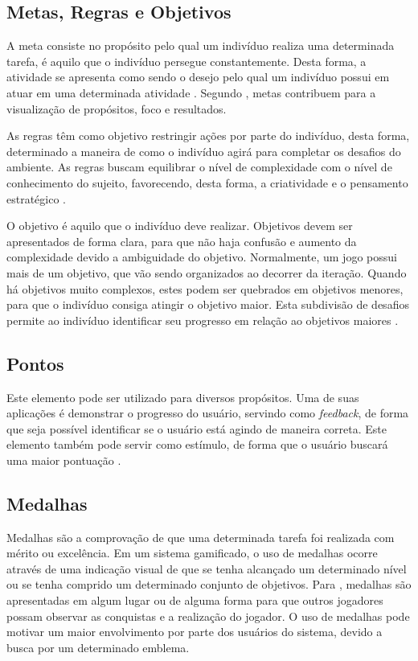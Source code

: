 \documentclass[
	12pt,				%
	oneside,			%
	a4paper,			%
	english,			%
	french,				%
	spanish,			%
	brazil,				%
	]{abntex2}
\begin{document}
\subsection{Metas, Regras e Objetivos}

A meta consiste no propósito pelo qual um indivíduo realiza uma determinada tarefa, é aquilo que o indivíduo persegue constantemente. Desta forma, a atividade se apresenta como sendo o desejo pelo qual um indivíduo possui em atuar em uma determinada atividade \cite{bunchball2016gamification}. Segundo \citet{kaap:2014}, metas contribuem para a visualização de propósitos, foco e resultados.

As regras têm como objetivo restringir ações por parte do indivíduo, desta forma, determinado a maneira de como o indivíduo agirá para completar os desafios do ambiente. As regras buscam equilibrar o nível de complexidade com o nível de conhecimento do sujeito, favorecendo, desta forma, a criatividade e o pensamento estratégico \cite{bunchball2016gamification}.

O objetivo é aquilo que o indivíduo deve realizar. Objetivos devem ser apresentados de forma clara, para que não haja confusão e aumento da complexidade devido a ambiguidade do objetivo. Normalmente, um jogo possui mais de um objetivo, que vão sendo organizados ao decorrer da iteração. Quando há objetivos muito complexos, estes podem ser quebrados em objetivos menores, para que o indivíduo consiga atingir o objetivo maior. Esta subdivisão de desafios permite ao indivíduo identificar seu progresso em relação ao objetivos maiores \cite{fardo2013gamificaccao}.

\subsection{Pontos}

Este elemento pode ser utilizado para diversos propósitos. Uma de suas aplicações é demonstrar o progresso do usuário, servindo como \textit{feedback}, de forma que seja possível identificar se o usuário está agindo de maneira correta. Este elemento também pode servir como estímulo, de forma que o usuário buscará uma maior pontuação \cite{kaap:2014}. 

\subsection{Medalhas}

Medalhas são a comprovação de que uma determinada tarefa foi realizada com mérito ou excelência. Em um sistema gamificado, o uso de medalhas ocorre através de uma indicação visual de que se tenha alcançado um determinado nível ou se tenha comprido um determinado conjunto de objetivos. Para \citet{deterding2011game}, medalhas são apresentadas em algum lugar ou de alguma forma para que outros jogadores possam observar as conquistas e a realização do jogador. O uso de medalhas pode motivar um maior envolvimento por parte dos usuários do sistema, devido a busca por um determinado emblema.
    
\end{document}
